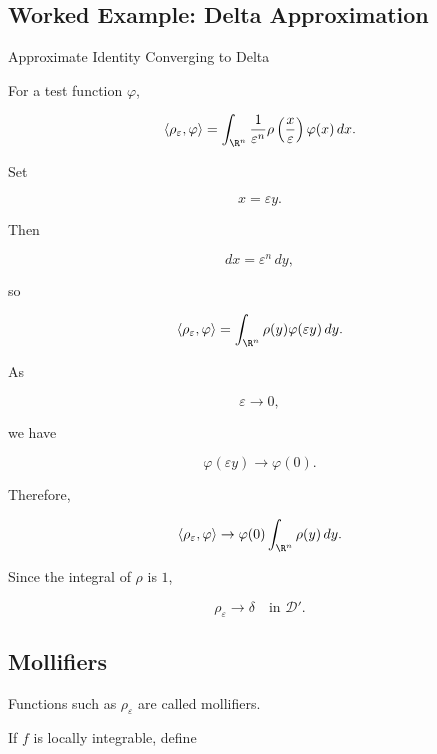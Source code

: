\subsection{Worked Example: Delta Approximation}
\label{subsec:worked-delta-approximation}

\begin{workedexamplebox}{Approximate Identity Converging to Delta}

For a test function \(\varphi\),

\[
\langle\rho_\varepsilon,\varphi\rangle
=
\int_{\R^n}
\frac{1}{\varepsilon^n}
\rho\left(\frac{x}{\varepsilon}\right)
\varphi(x)\,dx.
\]

Set

\[
x=\varepsilon y.
\]

Then

\[
dx=\varepsilon^n\,dy,
\]

so

\[
\langle\rho_\varepsilon,\varphi\rangle
=
\int_{\R^n}
\rho(y)\varphi(\varepsilon y)\,dy.
\]

As

\[
\varepsilon\to0,
\]

we have

\[
\varphi(\varepsilon y)\to\varphi(0).
\]

Therefore,

\[
\langle\rho_\varepsilon,\varphi\rangle
\to
\varphi(0)
\int_{\R^n}\rho(y)\,dy.
\]

Since the integral of \(\rho\) is \(1\),

\begin{answerbox}
\[
\boxed{
\rho_\varepsilon
\to
\delta
\quad
\text{in }\mathcal{D}'.
}
\]
\end{answerbox}

\end{workedexamplebox}

\subsection{Mollifiers}
\label{subsec:mollifiers}

Functions such as \(\rho_\varepsilon\) are called mollifiers.

If \(f\) is locally integrable, define

